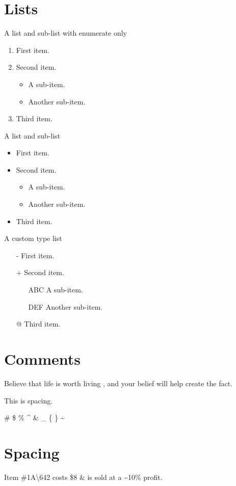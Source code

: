 \documentclass[a4paper,12pt]{report}
\begin{document}
\section{Lists}
A list and sub-list with enumerate only \\
\begin{enumerate}
\item First item.
\item Second item.
\begin{itemize}
\item A sub-item.
\item Another sub-item.
\end{itemize}
\item Third item.
\end{enumerate}

A list and sub-list \\
\begin{itemize}
\item First item.
\item Second item.
\begin{itemize}
\item A sub-item.
\item Another sub-item.
\end{itemize}
\item Third item.
\end{itemize}

A custom type list\\
\begin{itemize}
\item[-] First item.
\item[+] Second item.
\begin{itemize}
\item[ABC] A sub-item.
\item[DEF] Another sub-item.
\end{itemize}
\item[@] Third item.
\end{itemize}

\section{Comments}
Believe that life is worth living %
, and your belief will help create the fact.


\vspace{12pt}
\vspace{12pt}
\vspace{12pt}
\vspace{12pt}
\vspace{12pt}
This is spacing.

\# \$ \% \^{} \& \_ \{ \} \~{}

\section{Spacing}
\vspace{12pt}
\vspace{12pt}
\vspace{12pt}

Item \#1A\textbackslash642 costs \$8 \& is sold at a \~{}10\% profit.
\end{document}
